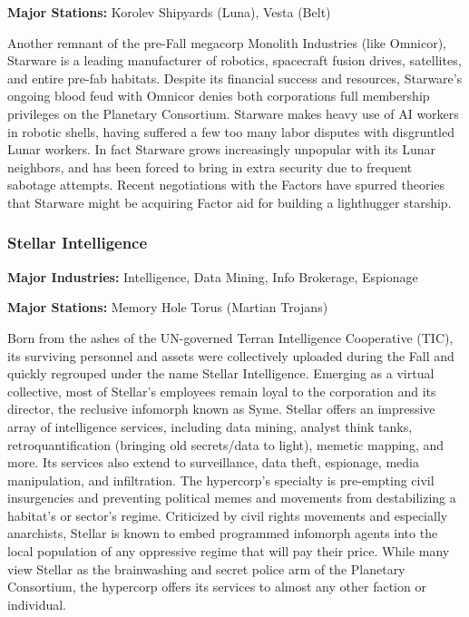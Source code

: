 \textbf{Major Stations:} Korolev Shipyards (Luna), Vesta (Belt) 

Another remnant of the pre-Fall megacorp Monolith Industries (like Omnicor), Starware is a leading manufacturer of robotics, spacecraft fusion drives, satellites, and entire pre-fab habitats. Despite its financial success and resources, Starware's ongoing blood feud with Omnicor denies both corporations full membership privileges on the Planetary Consortium. Starware makes heavy use of AI workers in robotic shells, having suffered a few too many labor disputes with disgruntled Lunar workers. In fact Starware grows increasingly unpopular with its Lunar neighbors, and has been forced to bring in extra security due to frequent sabotage attempts. Recent negotiations with the Factors have spurred theories that Starware might be acquiring Factor aid for building a lighthugger starship. 

\subsubsection{Stellar Intelligence} \label{sec:stellar-intelligence} 

\textbf{Major Industries:} Intelligence, Data Mining, Info Brokerage, Espionage 

\textbf{Major Stations:} Memory Hole Torus (Martian Trojans) 

Born from the ashes of the UN-governed Terran Intelligence Cooperative (TIC), its surviving personnel and assets were collectively uploaded during the Fall and quickly regrouped under the name Stellar Intelligence. Emerging as a virtual collective, most of Stellar's employees remain loyal to the corporation and its director, the reclusive infomorph known as Syme. Stellar offers an impressive array of intelligence services, including data mining, analyst think tanks, retroquantification (bringing old secrets/data to light), memetic mapping, and more. Its services also extend to surveillance, data theft, espionage, media manipulation, and infiltration. The hypercorp's specialty is pre-empting civil insurgencies and preventing political memes and movements from destabilizing a habitat's or sector's regime. Criticized by civil rights movements and especially anarchists, Stellar is known to embed programmed infomorph agents into the local population of any oppressive regime that will pay their price. While many view Stellar as the brainwashing and secret police arm of the Planetary Consortium, the hypercorp offers its services to almost any other faction or individual. 

